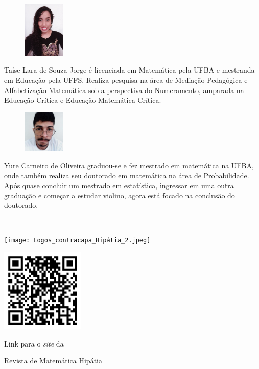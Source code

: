 \documentclass[onecolumn]{hipatia}
\begin{document}
\begin{center}
\begin{minipage}{12cm}
\begin{figure}
		\vspace{-10pt}
		\centering
		\includegraphics[width=2cm]{Taise.jpg}
	\end{figure}
	Taíse Lara de Souza Jorge é licenciada em Matemática pela UFBA 
	e mestranda em Educação pela UFFS. Realiza pesquisa na área de Mediação
	Pedagógica e Alfabetização Matemática sob a perspectiva do Numeramento, 
	amparada na Educação Crítica e Educação Matemática Crítica. 
\end{minipage}
\begin{minipage}{12cm}
	\vspace{0.3cm}
	\begin{figure}
		\vspace{-10pt}
		\centering
		\includegraphics[width=2cm]{yure.jpeg}
	\end{figure}
	Yure Carneiro de Oliveira graduou-se e fez mestrado em matemática na UFBA, onde também realiza seu doutorado em matemática na área de Probabilidade. Após quase concluir um mestrado em estatística, ingressar em uma outra graduação e começar a estudar violino, agora está focado na conclusão do doutorado.
\end{minipage}

\end{center}



\newpage

\pagestyle{empty}
\pagecolor{olivalight}
~
\vfill
\begin{center}
	\texttt{[image: Logos\_contracapa\_Hipátia\_2.jpeg]}

	\vspace{4cm}

	\includegraphics[width=4cm]{QR.png}
	
	Link para o \emph{site} da
	
	Revista de Matemática Hipátia

\end{center}
\end{document}
